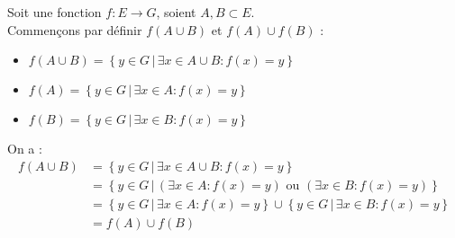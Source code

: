 \begin{exercice}
Soit une fonction $f:E\rightarrow G$, soient $A, B \subset E$.\\
Commençons par définir $f(A \cup B)$ et $f(A)\cup f(B)$ :
\begin{itemize}
    \item  $f(A \cup B) = \left\{y \in G \,|\, \exists x \in A \cup B : f(x) = y\right\}$

    \item $f(A) = \left\{y \in G \,|\, \exists x \in A : f(x) = y\right\}$

    \item $f(B) = \left\{y \in G \,|\, \exists x \in B : f(x) = y\right\}$
\end{itemize}

On a :
\begin{align*}
    f(A \cup B) &= \left\{y \in G \,|\, \exists x \in A \cup B : f(x) = y\right\}\\
                &= \left\{y \in G \,|\, \left(\exists x \in A : f(x) = y\right) \text{ ou } \left(\exists x \in B : f(x) = y\right) \right\}\\
                &= \left\{y \in G \,|\, \exists x \in A : f(x) = y\right\} \cup \left\{y \in G \,|\, \exists x \in B : f(x) = y\right\}\\
                  &= f(A)\cup f(B) \\
\end{align*}
\end{exercice}

